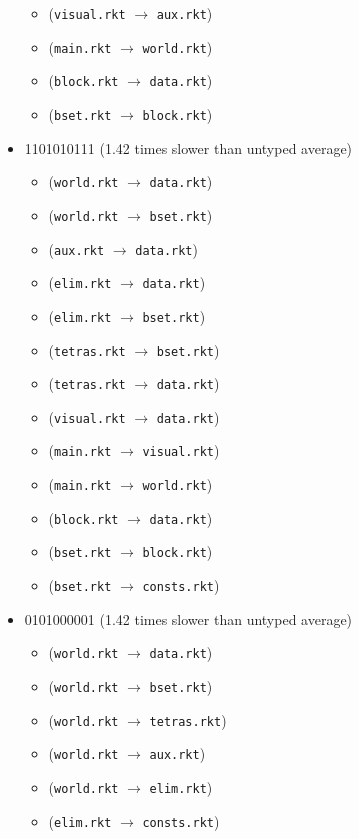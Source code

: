 \documentclass{article}
\newcommand{\mono}[1]{\texttt{#1}}
\begin{document}
\begin{itemize}
\begin{itemize}
  \item (\mono{visual.rkt} $\rightarrow$ \mono{aux.rkt})
  \item (\mono{main.rkt} $\rightarrow$ \mono{world.rkt})
  \item (\mono{block.rkt} $\rightarrow$ \mono{data.rkt})
  \item (\mono{bset.rkt} $\rightarrow$ \mono{block.rkt})
  \end{itemize}
\item 1101010111 (1.42 times slower than untyped average)
  \begin{itemize}
  \item (\mono{world.rkt} $\rightarrow$ \mono{data.rkt})
  \item (\mono{world.rkt} $\rightarrow$ \mono{bset.rkt})
  \item (\mono{aux.rkt} $\rightarrow$ \mono{data.rkt})
  \item (\mono{elim.rkt} $\rightarrow$ \mono{data.rkt})
  \item (\mono{elim.rkt} $\rightarrow$ \mono{bset.rkt})
  \item (\mono{tetras.rkt} $\rightarrow$ \mono{bset.rkt})
  \item (\mono{tetras.rkt} $\rightarrow$ \mono{data.rkt})
  \item (\mono{visual.rkt} $\rightarrow$ \mono{data.rkt})
  \item (\mono{main.rkt} $\rightarrow$ \mono{visual.rkt})
  \item (\mono{main.rkt} $\rightarrow$ \mono{world.rkt})
  \item (\mono{block.rkt} $\rightarrow$ \mono{data.rkt})
  \item (\mono{bset.rkt} $\rightarrow$ \mono{block.rkt})
  \item (\mono{bset.rkt} $\rightarrow$ \mono{consts.rkt})
  \end{itemize}
\item 0101000001 (1.42 times slower than untyped average)
  \begin{itemize}
  \item (\mono{world.rkt} $\rightarrow$ \mono{data.rkt})
  \item (\mono{world.rkt} $\rightarrow$ \mono{bset.rkt})
  \item (\mono{world.rkt} $\rightarrow$ \mono{tetras.rkt})
  \item (\mono{world.rkt} $\rightarrow$ \mono{aux.rkt})
  \item (\mono{world.rkt} $\rightarrow$ \mono{elim.rkt})
  \item (\mono{elim.rkt} $\rightarrow$ \mono{consts.rkt})

\end{itemize}
\end{itemize}
\end{document}

